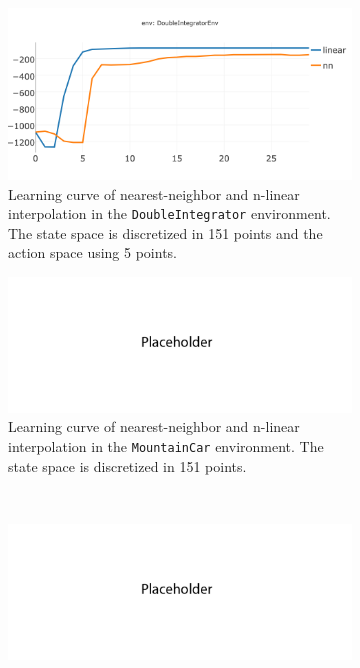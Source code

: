 \documentclass{article}
\begin{document}
\begin{enumerate}[(a)]
\begin{figure}[h!]
    \centering
    \begin{subfigure}{0.45\textwidth}
        \centering
        \includegraphics[width=\textwidth]{figures/part_2_c_a.png}
        \caption{Learning curve of  nearest-neighbor and n-linear interpolation in the \texttt{DoubleIntegrator} environment. 
                 The state space is discretized in 151 points and the action space using 5 points.}
    \end{subfigure}
    \hspace{0.2in}
    \begin{subfigure}{0.45\textwidth}
        \centering
        \includegraphics[width=\textwidth]{figures/placeholder_2.png}
         \caption{Learning curve of  nearest-neighbor and n-linear interpolation in the \texttt{MountainCar} environment. 
                 The state space is discretized in 151 points.}
    \end{subfigure}
\\
    \centering
    \begin{subfigure}{0.45\textwidth}
        \centering
        \includegraphics[width=\textwidth]{figures/placeholder_2.png}

\end{subfigure}
\end{figure}
\end{enumerate}
\end{document}
